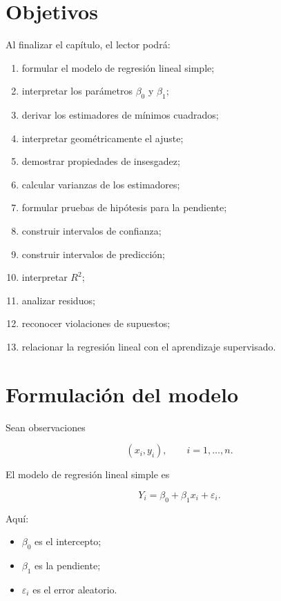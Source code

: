 \documentclass[
  spanish,
  10.5pt,
  letterpaper,
  DIV=11,
  numbers=noendperiod,
  oneside,
  open=any]{scrreprt}
\providecommand{\tightlist}{%
  \setlength{\itemsep}{0pt}\setlength{\parskip}{0pt}}
\theoremstyle{definition}
\theoremstyle{definition}
\theoremstyle{plain}
\theoremstyle{remark}
\begin{document}
\section*{Objetivos}\label{objetivos-8}


Al finalizar el capítulo, el lector podrá:

\begin{enumerate}
\def\labelenumi{\arabic{enumi}.}
\tightlist
\item
  formular el modelo de regresión lineal simple;
\item
  interpretar los parámetros \(\beta_0\) y \(\beta_1\);
\item
  derivar los estimadores de mínimos cuadrados;
\item
  interpretar geométricamente el ajuste;
\item
  demostrar propiedades de insesgadez;
\item
  calcular varianzas de los estimadores;
\item
  formular pruebas de hipótesis para la pendiente;
\item
  construir intervalos de confianza;
\item
  construir intervalos de predicción;
\item
  interpretar \(R^2\);
\item
  analizar residuos;
\item
  reconocer violaciones de supuestos;
\item
  relacionar la regresión lineal con el aprendizaje supervisado.
\end{enumerate}

\section*{Formulación del modelo}\label{formulaciuxf3n-del-modelo}


Sean observaciones

\[
(x_i,y_i),
\qquad
i=1,\ldots,n.
\]

El modelo de regresión lineal simple es

\[
Y_i
=
\beta_0
+
\beta_1x_i
+
\varepsilon_i.
\]

Aquí:

\begin{itemize}
\tightlist
\item
  \(\beta_0\) es el intercepto;
\item
  \(\beta_1\) es la pendiente;
\item
  \(\varepsilon_i\) es el error aleatorio.
\end{itemize}
\end{document}
